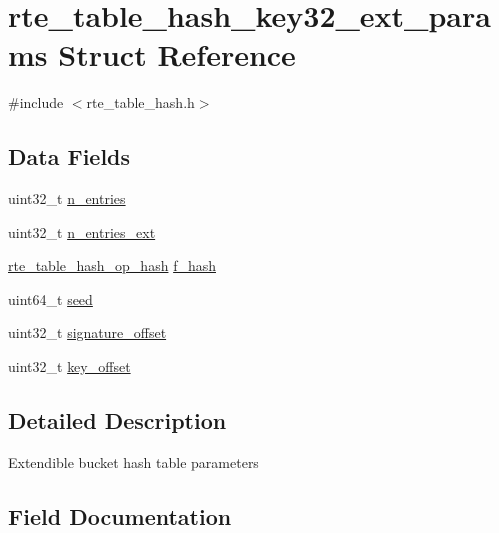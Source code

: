 \hypertarget{structrte__table__hash__key32__ext__params}{}\section{rte\+\_\+table\+\_\+hash\+\_\+key32\+\_\+ext\+\_\+params Struct Reference}
\label{structrte__table__hash__key32__ext__params}


{\ttfamily \#include $<$rte\+\_\+table\+\_\+hash.\+h$>$}

\subsection*{Data Fields}
\begin{DoxyCompactItemize}
\item 
uint32\+\_\+t \hyperlink{structrte__table__hash__key32__ext__params_aafba5a1f8ad65b41148894026098cad7}{n\+\_\+entries}
\item 
uint32\+\_\+t \hyperlink{structrte__table__hash__key32__ext__params_a27661399b844b87af80fbeb4052ae2cb}{n\+\_\+entries\+\_\+ext}
\item 
\hyperlink{rte__table__hash_8h_a6633f20f58e850abc3d1650af5d900da}{rte\+\_\+table\+\_\+hash\+\_\+op\+\_\+hash} \hyperlink{structrte__table__hash__key32__ext__params_a5a7373267cebe4384507b331c883624a}{f\+\_\+hash}
\item 
uint64\+\_\+t \hyperlink{structrte__table__hash__key32__ext__params_a13dfa5fcb8e1184f1f7756e717fd2807}{seed}
\item 
uint32\+\_\+t \hyperlink{structrte__table__hash__key32__ext__params_a255e199334632db5019afe0eb166a05a}{signature\+\_\+offset}
\item 
uint32\+\_\+t \hyperlink{structrte__table__hash__key32__ext__params_aa09132fc271bc1be2e4032587665bcf7}{key\+\_\+offset}
\end{DoxyCompactItemize}


\subsection{Detailed Description}
Extendible bucket hash table parameters 

\subsection{Field Documentation}
\hypertarget{structrte__table__hash__key32__ext__params_a5a7373267cebe4384507b331c883624a}{}
